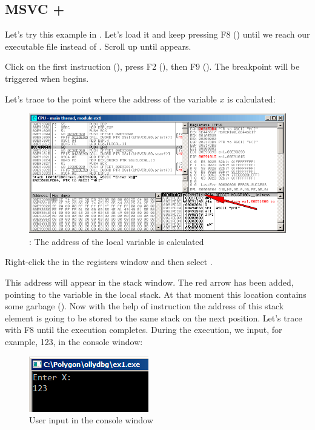 \clearpage
\subsection{MSVC + \olly}
\myindex{\olly}

Let's try this example in \olly.
Let's load it and keep pressing F8 (\stepover) until we reach our executable file instead of .
Scroll up until \main appears.

Click on the first instruction (), press F2 (), then F9 ().
The breakpoint will be triggered when \main begins.

Let's trace to the point where the address of the variable $x$ is calculated:

\begin{figure}[H]
\centering
\includegraphics[scale=\FigScale]{patterns/04_scanf/1_simple/ex1_olly_1.png}
\caption{\olly: The address of the local variable is calculated}
\label{fig:scanf_ex1_olly_1}
\end{figure}

Right-click the \EAX in the registers window and then select .

This address will appear in the stack window.
The red arrow has been added, pointing to the variable in the local stack.
At that moment this location contains some garbage ().
Now with the help of \PUSH instruction the address of this stack element is going to be stored to the same stack on the next position.
Let's trace with F8 until the \scanf execution completes.
During the \scanf execution, we input, for example, 123, in the console window:

\begin{figure}[H]
\centering
\includegraphics[scale=\NormalScale]{patterns/04_scanf/1_simple/ex1_olly_2.png}
\caption{User input in the console window}
\label{fig:scanf_ex1_olly_2}
\end{figure}

